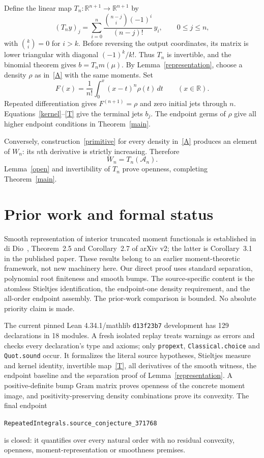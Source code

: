 \documentclass[11pt]{article}
\newcommand{\R}{\mathbb R}
\newcommand{\A}{\mathcal A}
\begin{document}
Define the linear map $T_n:\R^{n+1}\to\R^{n+1}$ by
\begin{equation}\label{T}
 (T_ny)_j=\sum_{i=0}^n
 \frac{\binom{n-j}{i}(-1)^i}{(n-j)!}\,y_i,
 \qquad 0\le j\le n,
\end{equation}
with $\binom{k}{i}=0$ for $i>k$. Before reversing the output coordinates,
its matrix is lower triangular with diagonal $(-1)^k/k!$. Thus $T_n$
is invertible, and the binomial theorem gives $b=T_nm(\mu)$.
By Lemma~\ref{representation}, choose a density $\rho$ as in~\eqref{A}
with the same moments. Set
\begin{equation}\label{primitive}
 F(x)=\frac1{n!}\int_0^x(x-t)^n\rho(t)\,dt\qquad(x\in\R).
\end{equation}
Repeated differentiation gives $F^{(n+1)}=\rho$ and zero initial jets
through $n$. Equations~\eqref{kernel}--\eqref{T} give the terminal jets
$b_j$. The endpoint germs of $\rho$ give all higher endpoint conditions
in Theorem~\ref{main}.

Conversely, construction~\eqref{primitive} for every density in~\eqref{A}
produces an element of $W_n$: its $n$th derivative is strictly increasing.
Therefore
\[
 W_n=T_n(\A_n).
\]
Lemma~\ref{open} and invertibility of $T_n$ prove openness, completing
Theorem~\ref{main}.

\section{Prior work and formal status}
Smooth representation of interior truncated moment functionals is established
in di Dio~\cite{diDio}, Theorem~2.5 and Corollary~2.7 of arXiv v2; the
latter is Corollary~3.1 in the published paper. These results belong to an
earlier moment-theoretic framework, not new machinery here. Our direct proof
uses standard separation, polynomial root finiteness and smooth bumps.
The source-specific content is the atomless Stieltjes identification,
the endpoint-one density requirement, and the all-order endpoint assembly.
The prior-work comparison is bounded. No absolute priority claim is made.

The current pinned Lean 4.34.1/mathlib \texttt{d13f23b7} development has
129 declarations in 18 modules. A fresh isolated replay treats warnings as
errors and checks every declaration's type and axioms; only
\texttt{propext}, \texttt{Classical.choice} and \texttt{Quot.sound} occur.
It formalizes the literal source hypotheses, Stieltjes measure and kernel
identity, invertible map~\eqref{T}, all derivatives of the smooth witness,
the endpoint baseline and the separation proof of
Lemma~\ref{representation}. A positive-definite bump Gram matrix proves
openness of the concrete moment image, and positivity-preserving density
combinations prove its convexity. The final endpoint
\begin{center}
\texttt{RepeatedIntegrals.source\_conjecture\_371768}
\end{center}
is closed: it quantifies over every natural order with no residual
convexity, openness, moment-representation or smoothness premises.
\end{document}
